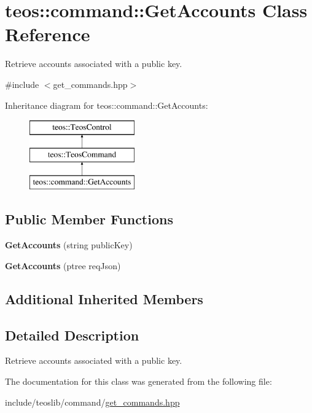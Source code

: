 \hypertarget{classteos_1_1command_1_1_get_accounts}{}\section{teos\+:\+:command\+:\+:Get\+Accounts Class Reference}
\label{classteos_1_1command_1_1_get_accounts}


Retrieve accounts associated with a public key.  




{\ttfamily \#include $<$get\+\_\+commands.\+hpp$>$}

Inheritance diagram for teos\+:\+:command\+:\+:Get\+Accounts\+:\begin{figure}[H]
\begin{center}
\leavevmode
\includegraphics[height=3.000000cm]{classteos_1_1command_1_1_get_accounts}
\end{center}
\end{figure}
\subsection*{Public Member Functions}
\begin{DoxyCompactItemize}
\item 
\mbox{\label{classteos_1_1command_1_1_get_accounts_a603eb927fd9617cb566e20a550a399ee}} 
{\bfseries Get\+Accounts} (string public\+Key)
\item 
\mbox{\label{classteos_1_1command_1_1_get_accounts_aafacb3452faaab3051b2b2876461c01d}} 
{\bfseries Get\+Accounts} (ptree req\+Json)
\end{DoxyCompactItemize}
\subsection*{Additional Inherited Members}


\subsection{Detailed Description}
Retrieve accounts associated with a public key. 

The documentation for this class was generated from the following file\+:\begin{DoxyCompactItemize}
\item 
include/teoslib/command/\mbox{\hyperlink{get__commands_8hpp}{get\+\_\+commands.\+hpp}}\end{DoxyCompactItemize}
